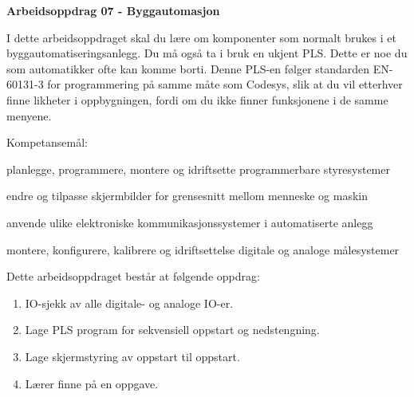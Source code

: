 
\noindent
{\bf Arbeidsoppdrag 07 - Byggautomasjon}

\vskip 5pt

I dette arbeidsoppdraget skal du lære om komponenter som normalt brukes i et byggautomatiseringsanlegg. Du må også ta i bruk en ukjent PLS. Dette er noe du som automatikker ofte kan komme borti. Denne PLS-en følger standarden EN-60131-3 for programmering på samme måte som Codesys, slik at du vil etterhver finne likheter i oppbygningen, fordi om du ikke finner funksjonene i de samme menyene. 

Kompetansemål:

planlegge, programmere, montere og idriftsette programmerbare styresystemer

endre og tilpasse skjermbilder for grensesnitt mellom menneske og maskin

anvende ulike elektroniske kommunikasjonssystemer i automatiserte anlegg

montere, konfigurere, kalibrere og idriftsettelse digitale og analoge målesystemer

Dette arbeidsoppdraget består at følgende oppdrag:
\begin{enumerate}
	\item IO-sjekk av alle digitale- og analoge IO-er. 
	\item Lage PLS program for sekvensiell oppstart og nedstengning. 
	\item Lage skjermstyring av oppstart til oppstart.
	\item Lærer finne på en oppgave. 
\end{enumerate}



